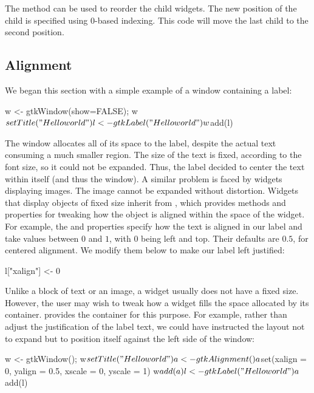 The  method can be used
to reorder the child widgets. The new position of the child is
specified using 0-based indexing. This code will move the last child
to the second position.
\begin{Schunk}
\end{Schunk}

\subsection{Alignment}
\label{sec:RGtk2:layout:align}

We began this section with a simple example of a window containing a
label:

\begin{Schunk}
\begin{Sinput}
 w <- gtkWindow(show=FALSE); w$setTitle("Hello world")
 l <- gtkLabel("Hello world")
 w$add(l)
\end{Sinput}
\end{Schunk}
%
The window allocates all of its space to the label, despite the actual
text consuming a much smaller region. The size of the text is fixed,
according to the font size, so it could not be expanded. Thus, the
label decided to center the text within itself (and thus the
window). A similar problem is faced by widgets displaying images. The
image cannot be expanded without distortion. Widgets that display
objects of fixed size inherit from , which provides
methods and properties for tweaking how the object is aligned within
the space of the widget. For example, the  and
 properties specify how the text is aligned in our label
and take values between $0$ and $1$, with $0$ being left and
top. Their defaults are $0.5$, for centered alignment. We modify them
below to make our label left justified:
\begin{Schunk}
\begin{Sinput}
 l["xalign"] <- 0
\end{Sinput}
\end{Schunk}

Unlike a block of text or an image, a widget usually does not have a
fixed size. However, the user may wish to tweak how a widget fills
the space allocated by its container.  \GTK\/ provides the
 container for this purpose. For example, rather
than adjust the justification of the label text, we could have
instructed the layout not to expand but to position itself against the
left side of the window:
\begin{Schunk}
\begin{Sinput}
 w <- gtkWindow(); w$setTitle("Hello world")
 a <- gtkAlignment()
 a$set(xalign = 0, yalign = 0.5, xscale = 0, yscale = 1)
 w$add(a)
 l <- gtkLabel("Hello world")
 a$add(l)
\end{Sinput}
\end{Schunk}

